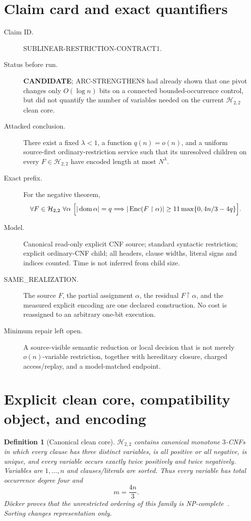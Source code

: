 \documentclass[11pt]{article}
\newtheorem{definition}{Definition}
\newcommand{\Enc}{\operatorname{Enc}}
\begin{document}
\section{Claim card and exact quantifiers}
\begin{description}
\item[Claim ID.] \textsf{SUBLINEAR-RESTRICTION-CONTRACT1}.
\item[Status before run.] \textbf{CANDIDATE}; ARC-STRENGTHEN8 had already
shown that one pivot changes only $O(\log n)$ bits on a connected
bounded-occurrence control, but did not quantify the number of variables
needed on the current $\mathcal H_{2,2}$ clean core.
\item[Attacked conclusion.] There exist a fixed $\lambda<1$, a function
$q(n)=o(n)$, and a uniform source-first ordinary-restriction service such
that its unresolved children on every $F\in\mathcal H_{2,2}$ have encoded
length at most $N^\lambda$.
\item[Exact prefix.] For the negative theorem,
\[
 \forall F\in\mathcal H_{2,2}\ \forall\alpha\ 
 \Bigl[|\operatorname{dom}\alpha|=q
 \Longrightarrow
 |\Enc(F\upharpoonright\alpha)|
 \ge 11\max\{0,4n/3-4q\}\Bigr].
 \]
\item[Model.] Canonical read-only explicit CNF source; standard syntactic
restriction; explicit ordinary-CNF child; all headers, clause widths,
literal signs and indices counted.  Time is not inferred from child size.
\item[SAME\_REALIZATION.] The source $F$, the partial assignment $\alpha$,
the residual $F\upharpoonright\alpha$, and the measured explicit encoding
are one declared construction.  No cost is reassigned to an arbitrary
one-bit execution.
\item[Minimum repair left open.] A source-visible semantic reduction or
local decision that is not merely $o(n)$-variable restriction, together with
hereditary closure, charged access/replay, and a model-matched endpoint.
\end{description}

\section{Explicit clean core, compatibility object, and encoding}
\begin{definition}[Canonical clean core]
$\mathcal H_{2,2}$ contains canonical monotone $3$-CNFs in which every
clause has three distinct variables, is all positive or all negative, is
unique, and every variable occurs exactly twice positively and twice
negatively.  Variables are $1,\ldots,n$ and clauses/literals are sorted.
Thus every variable has total occurrence degree four and
\[
 m=\frac{4n}{3}.
 \tag{1}
\]
D\"ocker proves that the unrestricted ordering of this family is
NP-complete~\cite{doecker}.  Sorting changes representation only.
\end{definition}
\end{document}
